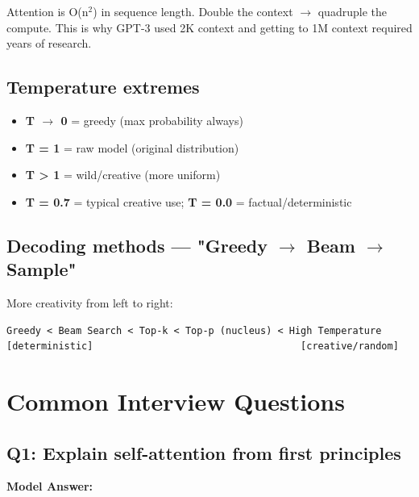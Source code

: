 \documentclass[11pt]{article}
\providecommand{\tightlist}{\setlength{\itemsep}{1pt}\setlength{\parskip}{0pt}}
\begin{document}
Attention is O(n\(^2\)) in sequence length. Double the context \(\rightarrow\) quadruple the compute. This is why GPT-3 used 2K context and getting to 1M context required years of research.

\subsection{Temperature extremes}\label{temperature-extremes}

\begin{itemize}
\tightlist
\item
  \textbf{T \(\rightarrow\) 0} = greedy (max probability always)
\item
  \textbf{T = 1} = raw model (original distribution)
\item
  \textbf{T \textgreater{} 1} = wild/creative (more uniform)
\item
  \textbf{T = 0.7} = typical creative use; \textbf{T = 0.0} = factual/deterministic
\end{itemize}

\subsection{\texorpdfstring{Decoding methods --- "Greedy \(\rightarrow\) Beam \(\rightarrow\) Sample"}{Decoding methods --- "Greedy \textbackslash rightarrow Beam \textbackslash rightarrow Sample"}}\label{decoding-methods--greedy-rightarrow-beam-rightarrow-sample}

More creativity from left to right:

\setcodelang{}

\begin{verbatim}
Greedy < Beam Search < Top-k < Top-p (nucleus) < High Temperature
[deterministic]                                    [creative/random]
\end{verbatim}

\section{Common Interview Questions}\label{common-interview-questions}

\subsection{Q1: Explain self-attention from first principles}\label{q1-explain-self-attention-from-first-principles}

\textbf{Model Answer:}
\end{document}

